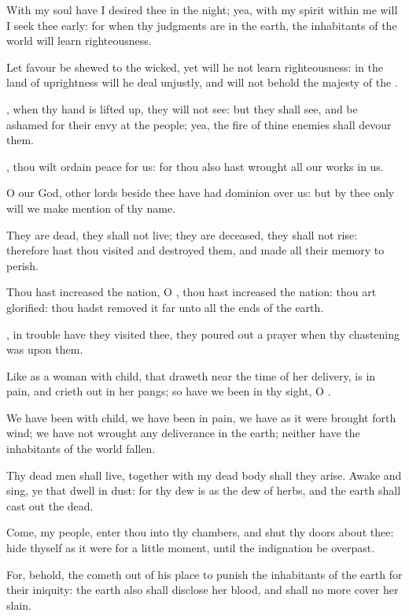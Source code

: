 \verse With my soul have I desired thee in the night; yea, with my spirit within me will I seek thee early: for when thy judgments are in the earth, the inhabitants of the world will learn righteousness.

\verse Let favour be shewed to the wicked, yet will he not learn righteousness: in the land of uprightness will he deal unjustly, and will not behold the majesty of the \LORD.

\verse \LORD, when thy hand is lifted up, they will not see: but they shall see, and be ashamed for their envy at the people; yea, the fire of thine enemies shall devour them.

\verse \LORD, thou wilt ordain peace for us: for thou also hast wrought all our works in us.

\verse O \LORD our God, other lords beside thee have had dominion over us: but by thee only will we make mention of thy name.

\verse They are dead, they shall not live; they are deceased, they shall not rise: therefore hast thou visited and destroyed them, and made all their memory to perish.

\verse Thou hast increased the nation, O \LORD, thou hast increased the nation: thou art glorified: thou hadst removed it far unto all the ends of the earth.

\verse \LORD, in trouble have they visited thee, they poured out a prayer when thy chastening was upon them.

\verse Like as a woman with child, that draweth near the time of her delivery, is in pain, and crieth out in her pangs; so have we been in thy sight, O \LORD.

\verse We have been with child, we have been in pain, we have as it were brought forth wind; we have not wrought any deliverance in the earth; neither have the inhabitants of the world fallen.

\verse Thy dead men shall live, together with my dead body shall they arise. Awake and sing, ye that dwell in dust: for thy dew is as the dew of herbs, and the earth shall cast out the dead.

\verse Come, my people, enter thou into thy chambers, and shut thy doors about thee: hide thyself as it were for a little moment, until the indignation be overpast.

\verse For, behold, the \LORD cometh out of his place to punish the inhabitants of the earth for their iniquity: the earth also shall disclose her blood, and shall no more cover her slain.


